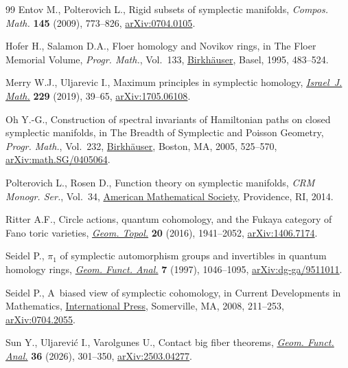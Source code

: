\begin{thebibliography}{99}
Entov M., Polterovich L., Rigid subsets of symplectic manifolds,
\textit{Compos. Math.}
 \textbf{145} (2009), 773--826,
 \href{http://arxiv.org/abs/0704.0105}{arXiv:0704.0105}.

Hofer H., Salamon D.A., Floer homology and {N}ovikov rings, in The {F}loer
 Memorial Volume, \textit{Progr. Math.}, Vol.~133,
 \href{https://doi.org/10.1007/978-3-0348-9217-9_20}{Birkh\"auser}, Basel,
 1995, 483--524.

Merry W.J., Uljarevic I., Maximum principles in symplectic homology,
 \href{https://doi.org/10.1007/s11856-018-1792-z}{\textit{Israel~J. Math.}}
 \textbf{229} (2019), 39--65,
 \href{http://arxiv.org/abs/1705.06108}{arXiv:1705.06108}.

Oh Y.-G., Construction of spectral invariants of {H}amiltonian paths on closed
 symplectic manifolds, in The Breadth of Symplectic and {P}oisson Geometry,
 \textit{Progr. Math.}, Vol.~232,
 \href{https://doi.org/10.1007/0-8176-4419-9_18}{Birkh\"auser}, Boston, MA,
 2005, 525--570,
 \href{http://arxiv.org/abs/math.SG/0405064}{arXiv:math.SG/0405064}.

Polterovich L., Rosen D., Function theory on symplectic manifolds,
 \textit{{CRM} Monogr. Ser.}, Vol.~34,
 \href{https://doi.org/10.1090/crmm/034}{American Mathematical Society},
 Providence, RI, 2014.

Ritter A.F., Circle actions, quantum cohomology, and the {F}ukaya category of
 {F}ano toric varieties,
 \href{https://doi.org/10.2140/gt.2016.20.1941}{\textit{Geom. Topol.}}
 \textbf{20} (2016), 1941--2052,
 \href{http://arxiv.org/abs/1406.7174}{arXiv:1406.7174}.

Seidel P., {$\pi_1$} of symplectic automorphism groups and invertibles in
 quantum homology rings,
 \href{https://doi.org/10.1007/s000390050037}{\textit{Geom. Funct. Anal.}}
 \textbf{7} (1997), 1046--1095,
 \href{http://arxiv.org/abs/dg-ga/9511011}{arXiv:dg-ga/9511011}.

Seidel P., A~biased view of symplectic cohomology, in Current Developments in
 Mathematics,
 \href{https://doi.org/10.4310/CDM.2006.v2006.n1.a4}{International Press},
 Somerville, MA, 2008, 211--253,
 \href{http://arxiv.org/abs/0704.2055}{arXiv:0704.2055}.

Sun Y., Uljarevi\'c I., Varolgunes U., Contact big fiber theorems,
 \href{https://doi.org/10.1007/s00039-026-00734-4}{\textit{Geom. Funct.
 Anal.}} \textbf{36} (2026), 301--350,
 \href{http://arxiv.org/abs/2503.04277}{arXiv:2503.04277}.


\end{thebibliography}

